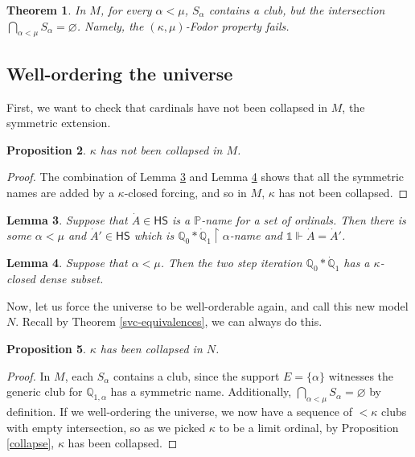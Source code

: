 \documentclass[a4paper,11pt]{amsart}
\newtheorem{theorem}{Theorem}[section]
\newtheorem{prop}[theorem]{Proposition}
\newtheorem{lemma}[theorem]{Lemma}
\theoremstyle{definition}
\newcommand{\Q}{\mathbb{Q}} %
\newcommand{\p}{\mathbb{P}}
\newcommand{\HS}{\mathsf{HS}}
\begin{document}
\begin{theorem}\label{not-fodor}\cite[Theorem 4.5]{karagila-fodor}
    In $M$, for every $\alpha < \mu$, $S_\alpha$ contains a club, but the intersection $\bigcap_{\alpha<\mu}S_\alpha = \varnothing$. Namely, the $(\kappa,\mu)$-Fodor property fails.
\end{theorem}

\subsection{Well-ordering the universe}

First, we want to check that cardinals have not been collapsed in $M$, the symmetric extension. 

\begin{prop}\label{not-collapsed}
    $\kappa$ has not been collapsed in $M$.
\end{prop}

\begin{proof}
    The combination of Lemma \ref{4.2} and Lemma \ref{4.3} shows that all the symmetric names are added by a $\kappa$-closed forcing, and so in $M$, $\kappa$ has not been collapsed. 
\end{proof}

\begin{lemma}\label{4.2}\cite[Lemma 4.2]{karagila-fodor}
    Suppose that $\dot{A} \in \HS$ is a $\p$-name for a set of ordinals. Then there is some $\alpha < \mu$ and $\dot{A}' \in \HS$ which is $\Q_0 \ast \dot{\Q}_1 \restriction \alpha$-name and $\mathds{1} \Vdash \dot{A} = \dot{A}'$. 
\end{lemma}

\begin{lemma}\label{4.3}\cite[Lemma 4.3]{karagila-fodor}
    Suppose that $\alpha < \mu$. Then the two step iteration $\Q_0 \ast \dot{\Q}_1$ has a $\kappa$-closed dense subset. 
\end{lemma} 

Now, let us force the universe to be well-orderable again, and call this new model $N$. Recall by Theorem \ref{svc-equivalences}, we can always do this. 

\begin{prop}\label{collapsed}
    $\kappa$ has been collapsed in $N$. 
\end{prop}

\begin{proof}
    In $M$, each $S_\alpha$ contains a club, since the support $E = \{\alpha\}$ witnesses the generic club for $\Q_{1,\alpha}$ has a symmetric name. Additionally, $\bigcap_{\alpha < \mu} S_\alpha = \varnothing$ by definition. If we  well-ordering the universe, we now have a sequence of $< \kappa$ clubs with empty intersection, so as we picked $\kappa$ to be a limit ordinal, by Proposition \ref{collapse}, $\kappa$ has been collapsed.
\end{proof}
\end{document}
